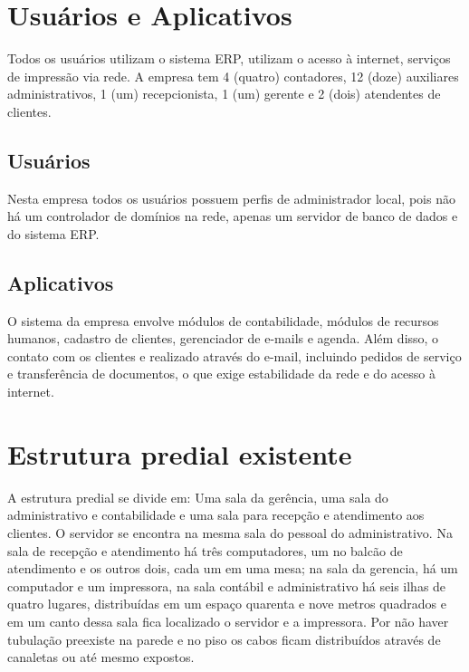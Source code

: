 \documentclass[	DIV=calc,%
							paper=a4,%
							fontsize=12pt,%
							onecolumn]{scrartcl}	 					%
\begin{document}
\section{Usuários e Aplicativos}
Todos os usuários utilizam o sistema ERP, utilizam o acesso à internet, serviços de impressão via rede. A empresa tem 4 (quatro) contadores, 12 (doze) auxiliares administrativos, 1 (um) recepcionista, 1 (um) gerente e 2 (dois) atendentes de clientes.
 

\subsection{Usuários}
Nesta empresa todos os usuários possuem perfis de administrador local, pois não há um controlador de domínios na rede, apenas um servidor de banco de dados e do sistema ERP. 

\subsection{Aplicativos}
O sistema da empresa envolve módulos de contabilidade, módulos de recursos humanos, cadastro de clientes, gerenciador de e-mails e agenda. Além disso, o contato com os clientes e realizado através do e-mail, incluindo pedidos de serviço e transferência de documentos, o que exige estabilidade da rede e do acesso à internet.


\section{Estrutura predial existente}

A estrutura predial se divide em: Uma sala da gerência, uma sala do administrativo e contabilidade e uma sala para recepção e atendimento aos clientes. O servidor se encontra na mesma sala do pessoal do administrativo. Na sala de recepção e atendimento há três computadores, um no balcão de atendimento e os outros dois, cada um em uma mesa; na sala da gerencia, há um computador e um impressora, na sala contábil e administrativo há seis ilhas de quatro lugares, distribuídas em um espaço quarenta e nove metros quadrados e em um canto dessa sala fica localizado o servidor e a impressora. Por não haver tubulação preexiste na parede e no piso os cabos ficam distribuídos através de canaletas ou até mesmo expostos.
\end{document}
